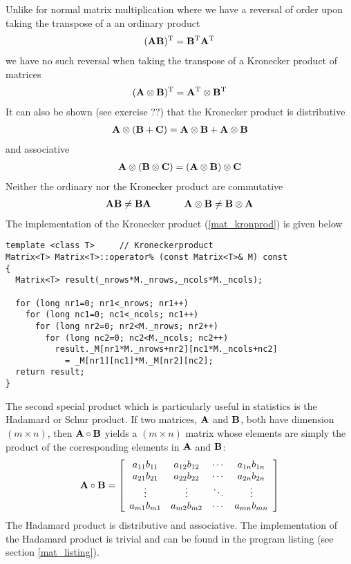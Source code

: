 Unlike for normal matrix multiplication
where we have a reversal of order upon taking the transpose of a
an ordinary product
\begin{eqnarray}
  ({\bf A} {\bf B})^{\rm T} = {\bf B}^{\rm T} {\bf A}^{\rm T}
\end{eqnarray}
we have no such reversal when taking the transpose of a Kronecker
product of matrices
\begin{eqnarray}
  ({\bf A} \otimes {\bf B})^{\rm T} = {\bf A}^{\rm T} \otimes {\bf B}^{\rm T}
    \label{mat_krontransp}
\end{eqnarray}
 It can also be shown (see exercise ??) that the Kronecker product
is distributive
\begin{eqnarray}
  {\bf A} \otimes ({\bf B} + {\bf C}) = {\bf A} \otimes {\bf B} + {\bf A} \otimes {\bf B}
   \label{mat_krondistr}
\end{eqnarray}
and associative
\begin{eqnarray}
  {\bf A} \otimes ({\bf B} \otimes {\bf C}) = ({\bf A} \otimes {\bf B}) \otimes {\bf C}
  \label{mat_kronassoc}
\end{eqnarray}
Neither the ordinary nor the Kronecker product are commutative
\begin{eqnarray}
  {\bf A} {\bf B} \neq {\bf B} {\bf A} \hspace{12mm} 
  {\bf A} \otimes {\bf B} \neq {\bf B} \otimes {\bf A} \nonumber
\end{eqnarray}
The implementation of the Kronecker product (\ref{mat_kronprod})
is given below
{\footnotesize \begin{verbatim}
template <class T>     // Kroneckerproduct
Matrix<T> Matrix<T>::operator% (const Matrix<T>& M) const
{
  Matrix<T> result(_nrows*M._nrows,_ncols*M._ncols);

  for (long nr1=0; nr1<_nrows; nr1++)
    for (long nc1=0; nc1<_ncols; nc1++)
      for (long nr2=0; nr2<M._nrows; nr2++)
        for (long nc2=0; nc2<M._ncols; nc2++)
          result._M[nr1*M._nrows+nr2][nc1*M._ncols+nc2]
            = _M[nr1][nc1]*M._M[nr2][nc2];
  return result;
}
\end{verbatim}}

The second special product which is particularly useful in statistics is
the Hadamard or Schur product. If two matrices, ${\bf A}$ and ${\bf B}$,
both have dimension $(m \times n)$, then ${\bf A} \circ {\bf B}$ yields
a $(m \times n)$ matrix whose elements are simply the product
of the corresponding elements in ${\bf A}$ and ${\bf B}$:
\begin{eqnarray}
  {\bf A} \circ {\bf B} = 
\left[ \begin{array}{cccc}
  a_{11} b_{11} & a_{12} b_{12} & \cdots & a_{1n} b_{1n} \\
  a_{21} b_{21} & a_{22} b_{22} & \cdots & a_{2n} b_{2n} \\
  \vdots & \vdots & \ddots & \vdots \\
  a_{m1} b_{m1} & a_{m2} b_{m2} & \cdots & a_{mn} b_{mn} 
\end{array} \right] 
\end{eqnarray}
The Hadamard product is distributive and associative. The 
implementation of the Hadamard product is trivial and can
be found in the program listing (see section \ref{mat_listing}).


